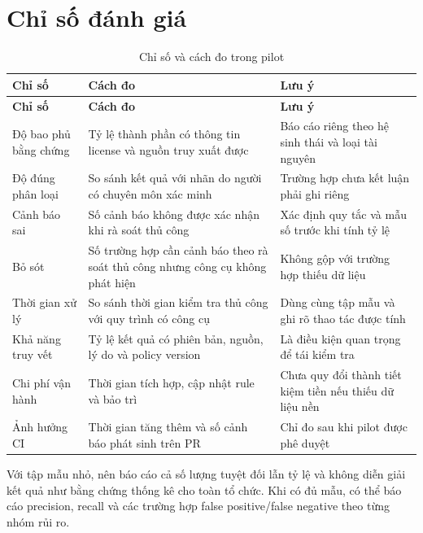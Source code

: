 \section{Chỉ số đánh giá}
\begin{longtable}{p{}p{}p{}}
\caption{Chỉ số và cách đo trong pilot}\label{tab:metrics}\\
\toprule
\textbf{Chỉ số} & \textbf{Cách đo} & \textbf{Lưu ý} \\
\midrule
\endfirsthead
\toprule
\textbf{Chỉ số} & \textbf{Cách đo} & \textbf{Lưu ý} \\
\midrule
\endhead
Độ bao phủ bằng chứng & Tỷ lệ thành phần có thông tin license và nguồn truy xuất được & Báo cáo riêng theo hệ sinh thái và loại tài nguyên \\
Độ đúng phân loại & So sánh kết quả với nhãn do người có chuyên môn xác minh & Trường hợp chưa kết luận phải ghi riêng \\
Cảnh báo sai & Số cảnh báo không được xác nhận khi rà soát thủ công & Xác định quy tắc và mẫu số trước khi tính tỷ lệ \\
Bỏ sót & Số trường hợp cần cảnh báo theo rà soát thủ công nhưng công cụ không phát hiện & Không gộp với trường hợp thiếu dữ liệu \\
Thời gian xử lý & So sánh thời gian kiểm tra thủ công với quy trình có công cụ & Dùng cùng tập mẫu và ghi rõ thao tác được tính \\
Khả năng truy vết & Tỷ lệ kết quả có phiên bản, nguồn, lý do và policy version & Là điều kiện quan trọng để tái kiểm tra \\
Chi phí vận hành & Thời gian tích hợp, cập nhật rule và bảo trì & Chưa quy đổi thành tiết kiệm tiền nếu thiếu dữ liệu nền \\
Ảnh hưởng CI & Thời gian tăng thêm và số cảnh báo phát sinh trên PR & Chỉ đo sau khi pilot được phê duyệt \\
\bottomrule
\end{longtable}

Với tập mẫu nhỏ, nên báo cáo cả số lượng tuyệt đối lẫn tỷ lệ và không diễn giải kết quả như bằng chứng thống kê cho toàn tổ chức. Khi có đủ mẫu, có thể báo cáo precision, recall và các trường hợp false positive/false negative theo từng nhóm rủi ro.

